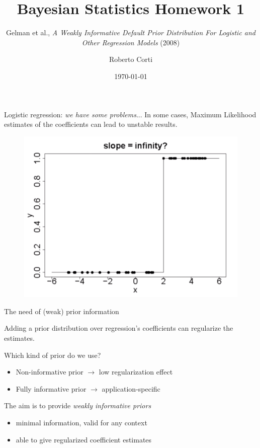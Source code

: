 \documentclass{beamer}
\title{Bayesian Statistics Homework 1}
\subtitle{Gelman et al., \textit{A Weakly Informative Default Prior Distribution For Logistic and Other Regression Models} (2008)}
\author{Roberto Corti}
\date{\today}
\begin{document}
	
	\frame{\titlepage}
	
	\begin{frame}{Logistic regression: \textit{we have some problems}... }
		In some cases, Maximum Likelihood estimates of the coefficients can lead to unstable results.
		
		\begin{figure}
			\includegraphics[scale=0.2]{imgs/separation.png}
		\end{figure}
		

		
	\end{frame}
	
\begin{frame}[t]{The need of (weak) prior information}
		
		Adding a prior distribution over regression's coefficients can regularize the estimates.
		\vspace{0.4cm}
		
		Which kind of prior do we use?
		
		\begin{itemize}
			\item Non-informative prior $\longrightarrow$ low regularization effect
			\item Fully informative prior $\longrightarrow$ application-specific
		\end{itemize}
	
		\vspace{0.3cm}
		The aim is to provide \textit{weakly informative priors}
		\begin{itemize}
			\item minimal information, valid for any context
			\item able to give regularized coefficient estimates
		\end{itemize}
	
\end{frame}
\end{document}

